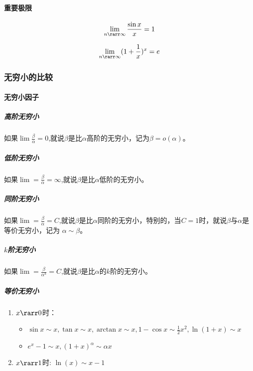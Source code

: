 \documentclass[
]{article}
\begin{document}
\hypertarget{ux91cdux8981ux6781ux9650}{%
\paragraph{重要极限}\label{ux91cdux8981ux6781ux9650}}

\[\lim\limits_{n \rarr \infty} \frac{\sin x}{x} = 1\]

\[\lim\limits_{n \rarr \infty} (1+\frac{1}{x})^x = e\]

\hypertarget{ux65e0ux7a77ux5c0fux7684ux6bd4ux8f83}{%
\subsubsection{无穷小的比较}\label{ux65e0ux7a77ux5c0fux7684ux6bd4ux8f83}}

\hypertarget{ux65e0ux7a77ux5c0fux56e0ux5b50}{%
\paragraph{无穷小因子}\label{ux65e0ux7a77ux5c0fux56e0ux5b50}}

\hypertarget{ux9ad8ux9636ux65e0ux7a77ux5c0f}{%
\subparagraph{高阶无穷小}\label{ux9ad8ux9636ux65e0ux7a77ux5c0f}}

如果\(\lim\limits \frac{\beta}{\alpha} = 0\),就说\(\beta\)是比\(\alpha\)高阶的无穷小，记为\(\beta = o(\alpha)\)。

\hypertarget{ux4f4eux9636ux65e0ux7a77ux5c0f}{%
\subparagraph{低阶无穷小}\label{ux4f4eux9636ux65e0ux7a77ux5c0f}}

如果\(\lim\limits = \frac{\beta}{\alpha} = \infty\),就说\(\beta\)是比\(\alpha\)低阶的无穷小。

\hypertarget{ux540cux9636ux65e0ux7a77ux5c0f}{%
\subparagraph{同阶无穷小}\label{ux540cux9636ux65e0ux7a77ux5c0f}}

如果\(\lim\limits = \frac{\beta}{\alpha} = C\),就说\(\beta\)是比\(\alpha\)同阶的无穷小，特别的，当\(C=1\)时，就说\(\beta \)与\(\alpha \)是等价无穷小，记为
\(\alpha \sim \beta\)。

\hypertarget{kuxaux9636ux65e0ux7a77ux5c0f}{%
\subparagraph{\texorpdfstring{\(k\)阶无穷小}{k阶无穷小}}\label{kuxaux9636ux65e0ux7a77ux5c0f}}

如果\(\lim\limits = \frac{\beta}{\alpha^k} = C\),就说\(\beta\)是比\(\alpha\)的\(k\)阶的无穷小。

\hypertarget{ux7b49ux4ef7ux65e0ux7a77ux5c0f}{%
\subparagraph{等价无穷小}\label{ux7b49ux4ef7ux65e0ux7a77ux5c0f}}

\begin{enumerate}
\def\labelenumi{\arabic{enumi}.}
\item
  \(x \rarr 0\)时：

  \begin{itemize}
  \item
    \(\sin x \sim x,\tan x \sim x , \arctan x \sim x ,1 - \cos x \sim \frac{1}{2} x^2, \ln(1+x) \sim x\)
  \item
    \(e^x - 1 \sim x, (1+x)^\alpha \sim \alpha x\)
  \end{itemize}
\item
  \(x \rarr 1\)时: \(\ln(x) \sim x-1\)
\end{enumerate}
\end{document}
